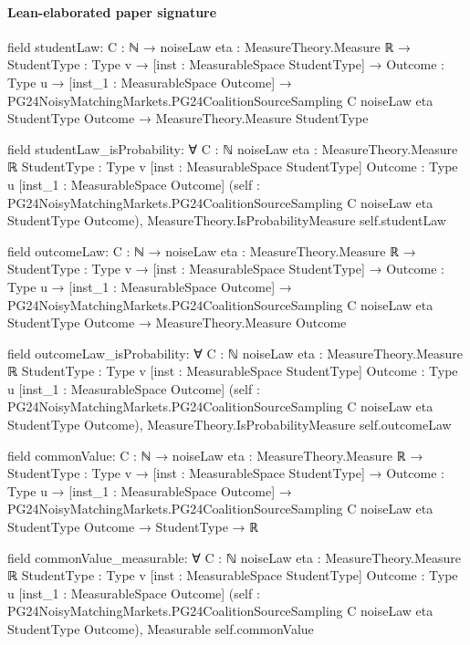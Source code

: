 \documentclass[10pt]{article}
\begin{document}
\paragraph{Lean-elaborated paper signature}
\begin{ReviewVerbatim}
field studentLaw:
{C : ℕ} →
  {noiseLaw eta : MeasureTheory.Measure ℝ} →
    {StudentType : Type v} →
      [inst : MeasurableSpace StudentType] →
        {Outcome : Type u} →
          [inst_1 : MeasurableSpace Outcome] →
            PG24NoisyMatchingMarkets.PG24CoalitionSourceSampling C noiseLaw eta StudentType Outcome →
              MeasureTheory.Measure StudentType

field studentLaw_isProbability:
∀ {C : ℕ} {noiseLaw eta : MeasureTheory.Measure ℝ} {StudentType : Type v} [inst : MeasurableSpace StudentType]
  {Outcome : Type u} [inst_1 : MeasurableSpace Outcome]
  (self : PG24NoisyMatchingMarkets.PG24CoalitionSourceSampling C noiseLaw eta StudentType Outcome),
  MeasureTheory.IsProbabilityMeasure self.studentLaw

field outcomeLaw:
{C : ℕ} →
  {noiseLaw eta : MeasureTheory.Measure ℝ} →
    {StudentType : Type v} →
      [inst : MeasurableSpace StudentType] →
        {Outcome : Type u} →
          [inst_1 : MeasurableSpace Outcome] →
            PG24NoisyMatchingMarkets.PG24CoalitionSourceSampling C noiseLaw eta StudentType Outcome →
              MeasureTheory.Measure Outcome

field outcomeLaw_isProbability:
∀ {C : ℕ} {noiseLaw eta : MeasureTheory.Measure ℝ} {StudentType : Type v} [inst : MeasurableSpace StudentType]
  {Outcome : Type u} [inst_1 : MeasurableSpace Outcome]
  (self : PG24NoisyMatchingMarkets.PG24CoalitionSourceSampling C noiseLaw eta StudentType Outcome),
  MeasureTheory.IsProbabilityMeasure self.outcomeLaw

field commonValue:
{C : ℕ} →
  {noiseLaw eta : MeasureTheory.Measure ℝ} →
    {StudentType : Type v} →
      [inst : MeasurableSpace StudentType] →
        {Outcome : Type u} →
          [inst_1 : MeasurableSpace Outcome] →
            PG24NoisyMatchingMarkets.PG24CoalitionSourceSampling C noiseLaw eta StudentType Outcome → StudentType → ℝ

field commonValue_measurable:
∀ {C : ℕ} {noiseLaw eta : MeasureTheory.Measure ℝ} {StudentType : Type v} [inst : MeasurableSpace StudentType]
  {Outcome : Type u} [inst_1 : MeasurableSpace Outcome]
  (self : PG24NoisyMatchingMarkets.PG24CoalitionSourceSampling C noiseLaw eta StudentType Outcome),
  Measurable self.commonValue


\end{ReviewVerbatim}
\end{document}
